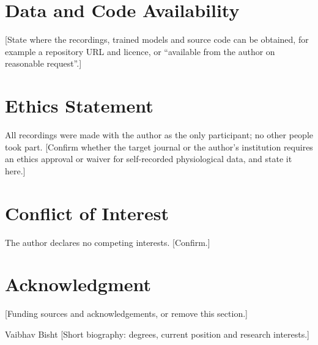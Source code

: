 \documentclass[journal]{IEEEtran}
\begin{document}
\IEEEpeerreviewmaketitle



\section*{Data and Code Availability}
[State where the recordings, trained models and source code can be obtained, for example a repository URL and licence, or ``available from the author on reasonable request''.]

\section*{Ethics Statement}
All recordings were made with the author as the only participant; no other people took part. [Confirm whether the target journal or the author's institution requires an ethics approval or waiver for self-recorded physiological data, and state it here.]

\section*{Conflict of Interest}
The author declares no competing interests. [Confirm.]

\section*{Acknowledgment}
[Funding sources and acknowledgements, or remove this section.]




\begin{IEEEbiographynophoto}{Vaibhav Bisht}
[Short biography: degrees, current position and research interests.]
\end{IEEEbiographynophoto}
\end{document}
